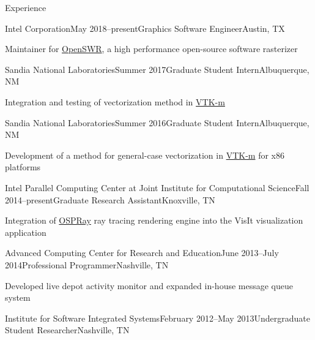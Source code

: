 \documentclass{resume} %
\begin{document}
\begin{rSection}{Experience}

\begin{rSubsection}{Intel Corporation}{May 2018--present}{Graphics Software Engineer}{Austin, TX}
    \item Maintainer for \href{http://openswr.org/}{OpenSWR}, a high performance open-source software rasterizer
\end{rSubsection}

\begin{rSubsection}{Sandia National Laboratories}{Summer 2017}{Graduate Student Intern}{Albuquerque, NM}
    \item Integration and testing of vectorization method in \href{http://m.vtk.org}{VTK-m}
\end{rSubsection}

\begin{rSubsection}{Sandia National Laboratories}{Summer 2016}{Graduate Student Intern}{Albuquerque, NM}
    \item Development of a method for general-case vectorization in \href{http://m.vtk.org}{VTK-m} for x86 platforms
\end{rSubsection}


\begin{rSubsection}{Intel Parallel Computing Center at Joint Institute for Computational Science}{Fall 2014--present}{Graduate Research Assistant}{Knoxville, TN}
    \item Integration of \href{http://www.ospray.org/}{OSPRay} ray tracing rendering engine into the VisIt visualization application
\end{rSubsection}


\begin{rSubsection}{Advanced Computing Center for Research and Education}{June 2013--July 2014}{Professional Programmer}{Nashville, TN}
\item Developed live depot activity monitor and expanded in-house message queue system
\end{rSubsection}


\begin{rSubsectionNoList}{Institute for Software Integrated Systems}{February 2012--May 2013}{Undergraduate Student Researcher}{Nashville, TN}
\end{rSubsectionNoList}


\end{rSection}
\end{document}
